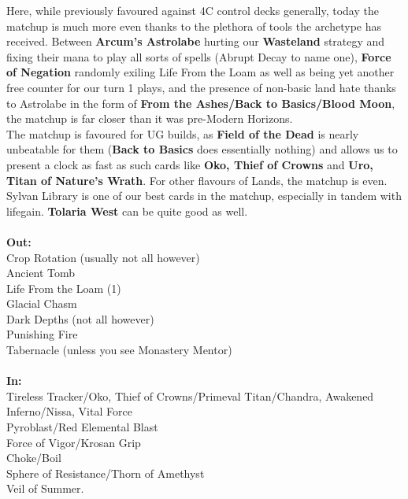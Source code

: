 \documentclass{report}
\begin{document}
Here, while previously favoured against 4C control decks generally, today the matchup is much more even thanks to the plethora of tools the archetype has received. Between \textbf{Arcum's Astrolabe} hurting our \textbf{Wasteland} strategy and fixing their mana to play all sorts of spells (Abrupt Decay to name one), \textbf{Force of Negation} randomly exiling Life From the Loam as well as being yet another free counter for our turn 1 plays, and the presence of non-basic land hate thanks to Astrolabe in the form of \textbf{From the Ashes/Back to Basics/Blood Moon}, the matchup is far closer than it was pre-Modern Horizons.\\
The matchup is favoured for UG builds, as \textbf{Field of the Dead} is nearly unbeatable for them (\textbf{Back to Basics} does essentially nothing) and allows us to present a clock as fast as such cards like \textbf{Oko, Thief of Crowns} and \textbf{Uro, Titan of Nature's Wrath}. For other flavours of Lands, the matchup is even. Sylvan Library is one of our best cards in the matchup, especially in tandem with lifegain. \textbf{Tolaria West} can be quite good as well.\\\\
\textbf{Out:}\\
Crop Rotation (usually not all however)\\Ancient Tomb\\Life From the Loam (1)\\Glacial Chasm\\Dark Depths (not all however)\\Punishing Fire\\Tabernacle (unless you see Monastery Mentor)\\\\	
\textbf{In:}\\
Tireless Tracker/Oko, Thief of Crowns/Primeval Titan/Chandra, Awakened Inferno/Nissa, Vital Force\\Pyroblast/Red Elemental Blast\\Force of Vigor/Krosan Grip\\Choke/Boil\\Sphere of Resistance/Thorn of Amethyst\\Veil of Summer.\\\\
\end{document}
